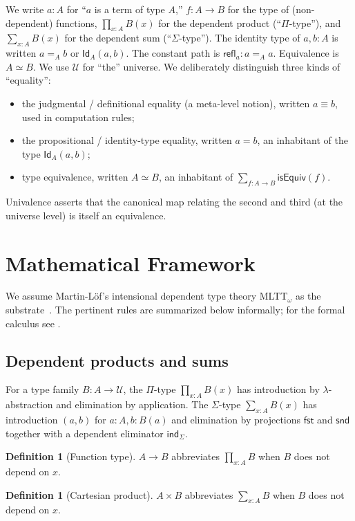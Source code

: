 \documentclass[12pt]{article}
\theoremstyle{definition}
\newtheorem{definition}[theorem]{Definition}
\theoremstyle{remark}
\newcommand{\U}{\mathcal{U}}
\newcommand{\Id}{\mathsf{Id}}
\newcommand{\refl}{\mathsf{refl}}
\newcommand{\eqv}{\simeq}
\newcommand{\fst}{\mathsf{fst}}
\newcommand{\snd}{\mathsf{snd}}
\begin{document}
We write $a : A$ for ``$a$ is a term of type $A$,'' $f : A \to B$ for the
type of (non-dependent) functions, $\prod_{x:A} B(x)$ for the dependent
product (``$\Pi$-type''), and $\sum_{x:A} B(x)$ for the dependent sum
(``$\Sigma$-type''). The identity type of $a, b : A$ is written
$a =_A b$ or $\Id_A(a, b)$. The constant path is $\refl_a : a =_A a$.
Equivalence is $A \eqv B$. We use $\U$ for ``the'' universe. We deliberately
distinguish three kinds of ``equality'':
\begin{itemize}
\item the judgmental / definitional equality (a meta-level notion), written
  $a \equiv b$, used in computation rules;
\item the propositional / identity-type equality, written $a = b$, an
  inhabitant of the type $\Id_A(a, b)$;
\item type equivalence, written $A \eqv B$, an inhabitant of
  $\sum_{f : A \to B} \mathsf{isEquiv}(f)$.
\end{itemize}
Univalence asserts that the canonical map relating the second and third (at
the universe level) is itself an equivalence.

\section{Mathematical Framework}
\label{sec:framework}

We assume Martin-L\"of's intensional dependent type theory MLTT$_\omega$ as
the substrate~\cite{MartinLof84}. The pertinent rules are summarized below
informally; for the formal calculus see \cite[Appendix~A]{HoTTBook}.

\subsection{Dependent products and sums}

For a type family $B : A \to \U$, the $\Pi$-type $\prod_{x : A} B(x)$ has
introduction by $\lambda$-abstraction and elimination by application.
The $\Sigma$-type $\sum_{x : A} B(x)$ has introduction $(a, b)$ for
$a : A, b : B(a)$ and elimination by projections $\fst$ and $\snd$ together
with a dependent eliminator $\mathsf{ind}_\Sigma$.

\begin{definition}[Function type]
\label{def:fn}
$A \to B$ abbreviates $\prod_{x : A} B$ when $B$ does not depend on $x$.
\end{definition}

\begin{definition}[Cartesian product]
\label{def:prod}
$A \times B$ abbreviates $\sum_{x : A} B$ when $B$ does not depend on $x$.
\end{definition}
\end{document}
